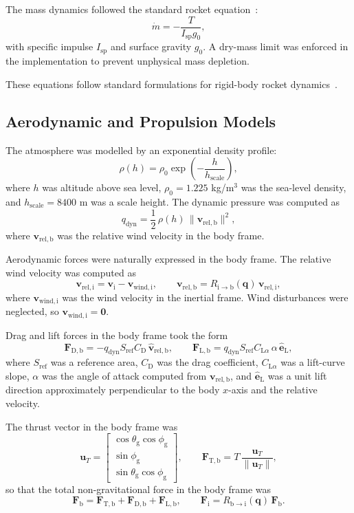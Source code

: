 The mass dynamics followed the standard rocket equation~\cite{sutton2017}:
\[
  \dot{m} = -\frac{T}{I_\mathrm{sp} g_0},
\]
with specific impulse \(I_\mathrm{sp}\) and surface gravity \(g_0\). A dry-mass
limit was enforced in the implementation to prevent unphysical mass depletion.

These equations follow standard formulations for rigid-body rocket dynamics~\cite{bryson1975,betts2010}.

\subsection{Aerodynamic and Propulsion Models}

The atmosphere was modelled by an exponential density profile:
\[
  \rho(h) = \rho_0 \exp\!\left(-\frac{h}{h_\mathrm{scale}}\right),
\]
where \(h\) was altitude above sea level, \(\rho_0 = 1.225\) kg/m\(^3\) was the
sea-level density, and \(h_\mathrm{scale} = 8400\) m was a scale height. The
dynamic pressure was computed as
\[
  q_\mathrm{dyn} = \frac{1}{2}\,\rho(h)\,\|\mathbf{v}_\mathrm{rel,b}\|^2,
\]
where \(\mathbf{v}_\mathrm{rel,b}\) was the relative wind velocity in the body
frame.

Aerodynamic forces were naturally expressed in the body frame. The relative wind
velocity was computed as
\[
  \mathbf{v}_\mathrm{rel,i} = \mathbf{v}_\mathrm{i} - \mathbf{v}_\mathrm{wind,i},
  \qquad
  \mathbf{v}_\mathrm{rel,b} =
  R_{\mathrm{i}\to\mathrm{b}}(\mathbf{q})\,\mathbf{v}_\mathrm{rel,i},
\]
where \(\mathbf{v}_\mathrm{wind,i}\) was the wind velocity in the inertial frame.
Wind disturbances were neglected, so \(\mathbf{v}_\mathrm{wind,i} = \mathbf{0}\).

Drag and lift forces in the body frame took the form
\[
  \mathbf{F}_\mathrm{D,b}
    = - q_\mathrm{dyn} S_\mathrm{ref} C_\mathrm{D}\,\hat{\mathbf{v}}_\mathrm{rel,b},
  \qquad
  \mathbf{F}_\mathrm{L,b}
    = q_\mathrm{dyn} S_\mathrm{ref} C_{\mathrm{L}\alpha}\,\alpha\,
      \hat{\mathbf{e}}_\mathrm{L},
\]
where \(S_\mathrm{ref}\) was a reference area, \(C_\mathrm{D}\) was the drag
coefficient, \(C_{\mathrm{L}\alpha}\) was a lift-curve slope, \(\alpha\) was the
angle of attack computed from \(\mathbf{v}_\mathrm{rel,b}\), and
\(\hat{\mathbf{e}}_\mathrm{L}\) was a unit lift direction approximately
perpendicular to the body \(x\)-axis and the relative velocity.

The thrust vector in the body frame was
\[
  \mathbf{u}_T =
  \begin{bmatrix}
    \cos\theta_\mathrm{g}\cos\phi_\mathrm{g} \\
    \sin\phi_\mathrm{g} \\
    \sin\theta_\mathrm{g}\cos\phi_\mathrm{g}
  \end{bmatrix},
  \qquad
  \mathbf{F}_\mathrm{T,b} = T\,\frac{\mathbf{u}_T}{\|\mathbf{u}_T\|},
\]
so that the total non-gravitational force in the body frame was
\[
  \mathbf{F}_\mathrm{b} =
  \mathbf{F}_\mathrm{T,b} +
  \mathbf{F}_\mathrm{D,b} +
  \mathbf{F}_\mathrm{L,b},
  \qquad
  \mathbf{F}_\mathrm{i} =
  R_{\mathrm{b}\to\mathrm{i}}(\mathbf{q})\,\mathbf{F}_\mathrm{b}.
\]


